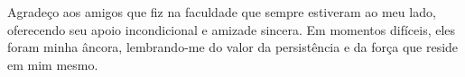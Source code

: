 Agradeço aos amigos que fiz na faculdade que sempre estiveram ao meu lado, oferecendo seu apoio incondicional e amizade sincera. Em momentos difíceis, eles foram minha âncora, lembrando-me do valor da persistência e da força que reside em mim mesmo.

